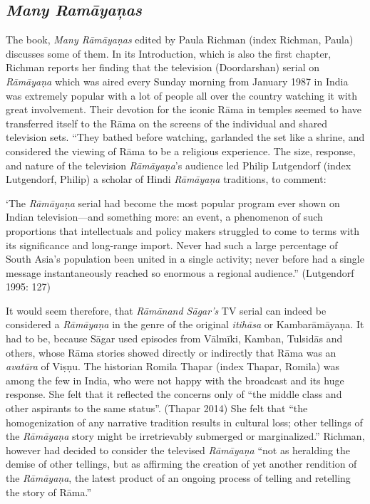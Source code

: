 \subsection{\textit{Many Ramāyaņas}}

\item The book, \textit{Many Rāmāyaṇas} edited by Paula Richman (index Richman, Paula) discusses some of them. In its Introduction, which is also the first chapter, Richman reports her finding that the television (Doordarshan) serial on \textit{Rāmāyaṇa} which was aired every Sunday morning from January 1987 in India was extremely popular with a lot of people all over the country watching it with great involvement. Their devotion for the iconic Rāma in temples seemed to have transferred itself to the Rāma on the screens of the individual and shared television sets. “They bathed before watching, garlanded the set like a shrine, and considered the viewing of Rāma to be a religious experience. The size, response, and nature of the television \textit{Rāmāyaṇa}'s audience led Philip Lutgendorf (index Lutgendorf, Philip) a scholar of Hindi \textit{Rāmāyaṇa} traditions, to comment:


\begin{myquote}
‘The \textit{Rāmāyaṇa} serial had become the most popular program ever shown on Indian television—and something more: an event, a phenomenon of such proportions that intellectuals and policy makers struggled to come to terms with its significance and long-range import. Never had such a large percentage of South Asia's population been united in a single activity; never before had a single message instantaneously reached so enormous a regional audience.” (Lutgendorf 1995: 127)
\end{myquote}

It would seem therefore, that \textit{Rāmānand Sāgar’s} TV serial can indeed be considered a \textit{Rāmāyaṇa} in the genre of the original \textit{itihāsa} or Kambarāmāyaņa. It had to be, because Sāgar used episodes from Vālmīki, Kamban, Tulsidās and others, whose Rāma stories showed directly or indirectly that Rāma was an \textit{avatāra} of Viṣṇu. The historian Romila Thapar (index Thapar, Romila) was among the few in India, who were not happy with the broadcast and its huge response. She felt that it reflected the concerns only of “the middle class and other aspirants to the same status”. (Thapar 2014) She felt that “the homogenization of any narrative tradition results in cultural loss; other tellings of the \textit{Rāmāyaṇa} story might be irretrievably submerged or marginalized.” Richman, however had decided to consider the televised \textit{Rāmāyaṇa} “not as heralding the demise of other tellings, but as affirming the creation of yet another rendition of the \textit{Rāmāyaṇa}, the latest product of an ongoing process of telling and retelling the story of Rāma.”

